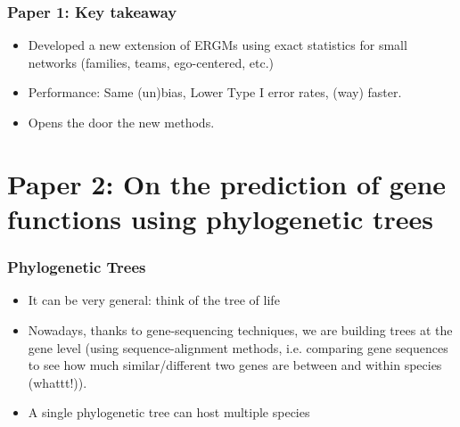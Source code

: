 \documentclass[aspectratio=169, 10pt]{beamer}\usepackage[]{graphicx}\usepackage[]{color}
\def\cursection{\frame{\frametitle{Contents}\tableofcontents[current]}}
\begin{document}
\begin{frame}
\frametitle{Paper 1: Key takeaway}
\pause
\begin{itemize}[<+->]
\item Developed a new extension of ERGMs using exact statistics for small networks
(families, teams, ego-centered, etc.)
\item Performance: Same (un)bias, Lower Type I error rates, (way) faster.
\item Opens the door the new methods.
\end{itemize}
\end{frame}


\section{Paper 2: On the prediction of gene functions using phylogenetic trees}
\cursection

\begin{frame}
\frametitle{Phylogenetic Trees}
\pause
\begin{itemize}[<+->]
\item It can be very general: think of the tree of life
\item Nowadays, thanks to gene-sequencing techniques, we are building trees at the
gene level (using sequence-alignment methods, i.e. comparing gene sequences to see how much similar/different two genes are between and within species (whattt!)).
\item A single phylogenetic tree can host multiple species
\end{itemize}

\end{frame}
\end{document}

